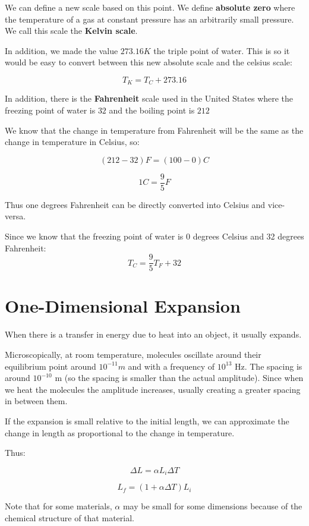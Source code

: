 \documentclass{report}
\begin{document}
We can define a new scale based on this point. We define \textbf{absolute zero} where the temperature of a gas at constant pressure has an arbitrarily small pressure. We call this scale the \textbf{Kelvin scale}.

In addition, we made the value $273.16 K$ the triple point of water. This is so it would be easy to convert between this new absolute scale and the celsius scale:

$$T_K = T_C + 273.16 $$ 

In addition, there is the \textbf{Fahrenheit} scale used in the United States where the freezing point of water is $32$ and the boiling point is $212$

We know that the change in temperature from Fahrenheit will be the same as the change in temperature in Celsius, so:

$$(212-32)F = (100-0)C$$

$$1 C = \frac{9}{5}F$$

Thus one degrees Fahrenheit can be directly converted into Celsius and vice-versa.

Since we know that the freezing point of water is 0 degrees Celsius and 32 degrees Fahrenheit:
$$T_C = \frac{9}{5}T_F + 32$$


\section{One-Dimensional Expansion}

When there is a transfer in energy due to heat into an object, it usually expands.

Microscopically, at room temperature, molecules oscillate around their equilibrium point around $10^{-11} m$ and with a frequency of $10^{13}$ Hz. The spacing is around $10^{-10}$ m (so the spacing is smaller than the actual amplitude). Since when we heat the molecules the amplitude increases, usually creating a greater spacing in between them. 

If the expansion is small relative to the initial length, we can approximate the change in length as proportional to the change in temperature.

Thus:

$$
\boxed{
\Delta L = \alpha L_i \Delta T
}
$$

$$L_f = (1+\alpha\Delta T)L_i$$

Note that for some materials, $\alpha$ may be small for some dimensions because of the chemical structure of that material.
\end{document}
